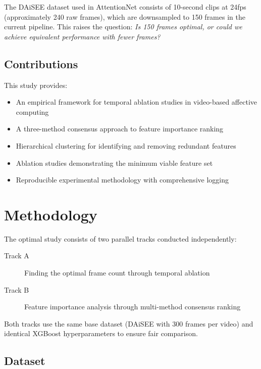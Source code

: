 \documentclass[11pt,a4paper]{article}
\begin{document}
The DAiSEE dataset used in AttentionNet consists of 10-second clips at 24fps (approximately 240 raw frames), which are downsampled to 150 frames in the current pipeline. This raises the question: \textit{Is 150 frames optimal, or could we achieve equivalent performance with fewer frames?}

\subsection{Contributions}

This study provides:
\begin{itemize}
    \item An empirical framework for temporal ablation studies in video-based affective computing
    \item A three-method consensus approach to feature importance ranking
    \item Hierarchical clustering for identifying and removing redundant features
    \item Ablation studies demonstrating the minimum viable feature set
    \item Reproducible experimental methodology with comprehensive logging
\end{itemize}

\section{Methodology}\label{sec:methodology}

The optimal study consists of two parallel tracks conducted independently:

\begin{description}
    \item[Track A] Finding the optimal frame count through temporal ablation
    \item[Track B] Feature importance analysis through multi-method consensus ranking
\end{description}

Both tracks use the same base dataset (DAiSEE with 300 frames per video) and identical XGBoost hyperparameters to ensure fair comparison.

\subsection{Dataset}
\end{document}
